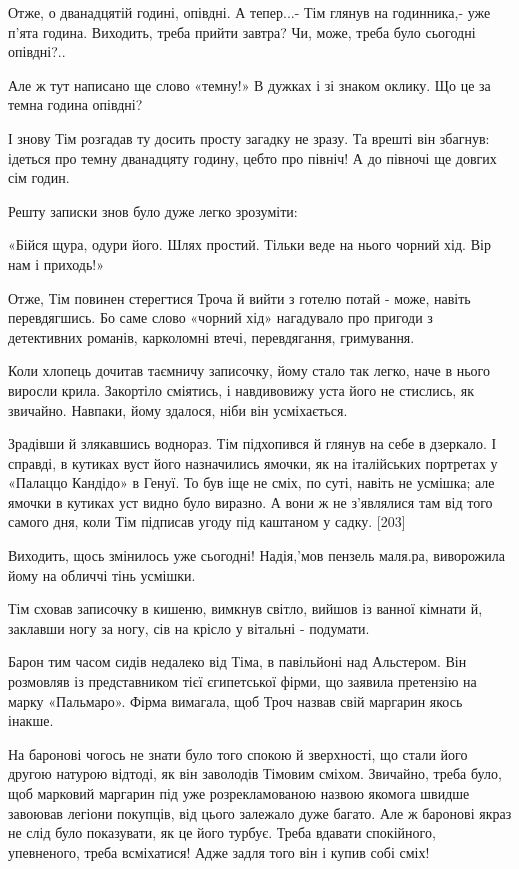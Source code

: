 Отже, о дванадцятій годині, опівдні. А тепер...- Тім глянув на годинника,- уже п'ята година. Виходить, треба прийти завтра? Чи, може, треба було сьогодні опівдні?..

Але ж тут написано ще слово «темну!» В дужках і зі знаком оклику. Що це за темна година опівдні?

І знову Тім розгадав ту досить просту загадку не зразу. Та врешті він збагнув: ідеться про темну дванадцяту годину, цебто про північ! А до півночі ще довгих сім годин.

Решту записки знов було дуже легко зрозуміти:

«Бійся щура, одури його. Шлях простий. Тільки веде на нього чорний хід. Вір нам і приходь!»

Отже, Тім повинен стерегтися Троча й вийти з готелю потай - може, навіть перевдягшись. Бо саме слово «чорний хід» нагадувало про пригоди з детективних романів, карколомні втечі, перевдягання, гримування.

Коли хлопець дочитав таємничу записочку, йому стало так легко, наче в нього виросли крила. Закортіло сміятись, і навдивовижу уста його не стислись, як звичайно. Навпаки, йому здалося, ніби він усміхається.

Зрадівши й злякавшись воднораз. Тім підхопився й глянув на себе в дзеркало. І справді, в кутиках вуст його назначились ямочки, як на італійських портретах у «Палаццо Кандідо» в Генуї. То був іще не сміх, по суті, навіть не усмішка; але ямочки в кутиках уст видно було виразно. А вони ж не з'являлися там від того самого дня, коли Тім підписав угоду під каштаном у садку. [203]

Виходить, щось змінилось уже сьогодні! Надія,'мов пензель маля.ра, виворожила йому на обличчі тінь усмішки.

Тім сховав записочку в кишеню, вимкнув світло, вийшов із ванної кімнати й, заклавши ногу за ногу, сів на крісло у вітальні - подумати.

Барон тим часом сидів недалеко від Тіма, в павільйоні над Альстером. Він розмовляв із представником тієї єгипетської фірми, що заявила претензію на марку «Пальмаро». Фірма вимагала, щоб Троч назвав свій маргарин якось інакше.

На баронові чогось не знати було того спокою й зверхності, що стали його другою натурою відтоді, як він заволодів Тімовим сміхом. Звичайно, треба було, щоб марковий маргарин під уже розрекламованою назвою якомога швидше завоював легіони покупців, від цього залежало дуже багато. Але ж баронові якраз не слід було показувати, як це його турбує. Треба вдавати спокійного, упевненого, треба всміхатися! Адже задля того він і купив собі сміх!

